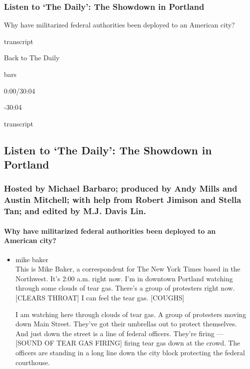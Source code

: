 \hypertarget{listen-to-the-daily-the-showdown-in-portland}{%
\subsubsection{Listen to `The Daily': The Showdown in
Portland}\label{listen-to-the-daily-the-showdown-in-portland}}

Why have militarized federal authorities been deployed to an American
city?

transcript

Back to The Daily

bars

0:00/30:04

-30:04

transcript

\hypertarget{listen-to-the-daily-the-showdown-in-portland-1}{%
\subsection{Listen to `The Daily': The Showdown in
Portland}\label{listen-to-the-daily-the-showdown-in-portland-1}}

\hypertarget{hosted-by-michael-barbaro-produced-by-andy-mills-and-austin-mitchell-with-help-from-robert-jimison-and-stella-tan-and-edited-by-mj-davis-lin}{%
\subsubsection{Hosted by Michael Barbaro; produced by Andy Mills and
Austin Mitchell; with help from Robert Jimison and Stella Tan; and
edited by M.J. Davis
Lin.}\label{hosted-by-michael-barbaro-produced-by-andy-mills-and-austin-mitchell-with-help-from-robert-jimison-and-stella-tan-and-edited-by-mj-davis-lin}}

\hypertarget{why-have-militarized-federal-authorities-been-deployed-to-an-american-city}{%
\paragraph{Why have militarized federal authorities been deployed to an
American
city?}\label{why-have-militarized-federal-authorities-been-deployed-to-an-american-city}}

\begin{itemize}
\item
  mike baker\\
  This is Mike Baker, a correspondent for The New York Times based in
  the Northwest. It's 2:00 a.m. right now. I'm in downtown Portland
  watching through some clouds of tear gas. There's a group of
  protesters right now. {[}CLEARS THROAT{]} I can feel the tear gas.
  {[}COUGHS{]}

  I am watching here through clouds of tear gas. A group of protesters
  moving down Main Street. They've got their umbrellas out to protect
  themselves. And just down the street is a line of federal officers.
  They're firing --- {[}SOUND OF TEAR GAS FIRING{]} firing tear gas down
  at the crowd. The officers are standing in a long line down the city
  block protecting the federal courthouse.
\end{itemize}

